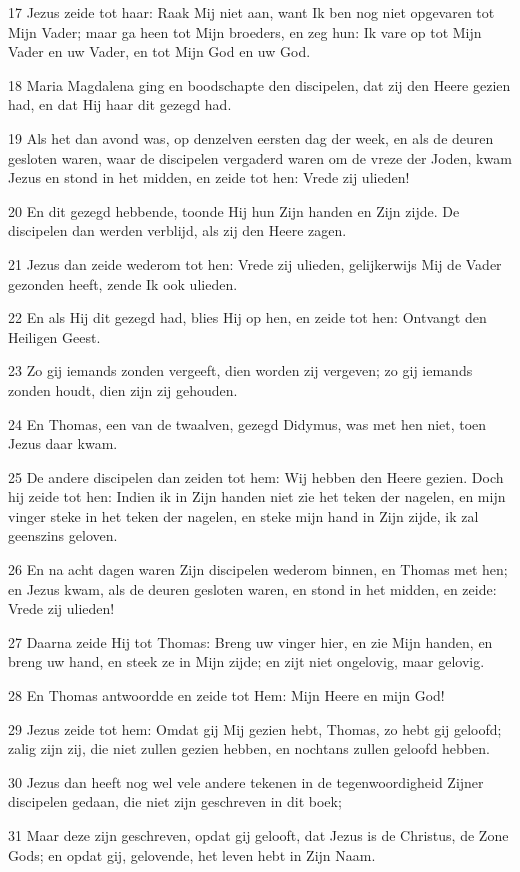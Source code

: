 \par 17 Jezus zeide tot haar: Raak Mij niet aan, want Ik ben nog niet opgevaren tot Mijn Vader; maar ga heen tot Mijn broeders, en zeg hun: Ik vare op tot Mijn Vader en uw Vader, en tot Mijn God en uw God.
\par 18 Maria Magdalena ging en boodschapte den discipelen, dat zij den Heere gezien had, en dat Hij haar dit gezegd had.
\par 19 Als het dan avond was, op denzelven eersten dag der week, en als de deuren gesloten waren, waar de discipelen vergaderd waren om de vreze der Joden, kwam Jezus en stond in het midden, en zeide tot hen: Vrede zij ulieden!
\par 20 En dit gezegd hebbende, toonde Hij hun Zijn handen en Zijn zijde. De discipelen dan werden verblijd, als zij den Heere zagen.
\par 21 Jezus dan zeide wederom tot hen: Vrede zij ulieden, gelijkerwijs Mij de Vader gezonden heeft, zende Ik ook ulieden.
\par 22 En als Hij dit gezegd had, blies Hij op hen, en zeide tot hen: Ontvangt den Heiligen Geest.
\par 23 Zo gij iemands zonden vergeeft, dien worden zij vergeven; zo gij iemands zonden houdt, dien zijn zij gehouden.
\par 24 En Thomas, een van de twaalven, gezegd Didymus, was met hen niet, toen Jezus daar kwam.
\par 25 De andere discipelen dan zeiden tot hem: Wij hebben den Heere gezien. Doch hij zeide tot hen: Indien ik in Zijn handen niet zie het teken der nagelen, en mijn vinger steke in het teken der nagelen, en steke mijn hand in Zijn zijde, ik zal geenszins geloven.
\par 26 En na acht dagen waren Zijn discipelen wederom binnen, en Thomas met hen; en Jezus kwam, als de deuren gesloten waren, en stond in het midden, en zeide: Vrede zij ulieden!
\par 27 Daarna zeide Hij tot Thomas: Breng uw vinger hier, en zie Mijn handen, en breng uw hand, en steek ze in Mijn zijde; en zijt niet ongelovig, maar gelovig.
\par 28 En Thomas antwoordde en zeide tot Hem: Mijn Heere en mijn God!
\par 29 Jezus zeide tot hem: Omdat gij Mij gezien hebt, Thomas, zo hebt gij geloofd; zalig zijn zij, die niet zullen gezien hebben, en nochtans zullen geloofd hebben.
\par 30 Jezus dan heeft nog wel vele andere tekenen in de tegenwoordigheid Zijner discipelen gedaan, die niet zijn geschreven in dit boek;
\par 31 Maar deze zijn geschreven, opdat gij gelooft, dat Jezus is de Christus, de Zone Gods; en opdat gij, gelovende, het leven hebt in Zijn Naam.

